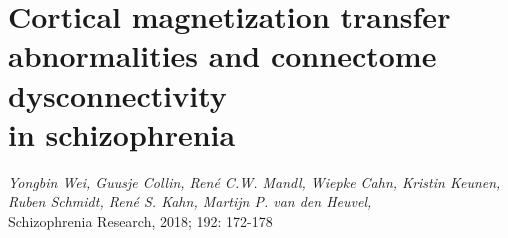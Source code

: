 \chapter[Cortical magnetization transfer abnormalities and connectome dysconnectivity in schizophrenia]{Cortical magnetization transfer abnormalities and connectome dysconnectivity \\in schizophrenia}


\label{ch:mtrscz}

\begin{flushright}
\textit{Yongbin Wei, Guusje Collin, René C.W. Mandl, Wiepke Cahn, Kristin Keunen, \\Ruben Schmidt, René S. Kahn, Martijn P. van den Heuvel,
}\\
Schizophrenia Research, 2018; 192: 172-178
\vspace{7 mm}

\end{flushright}

